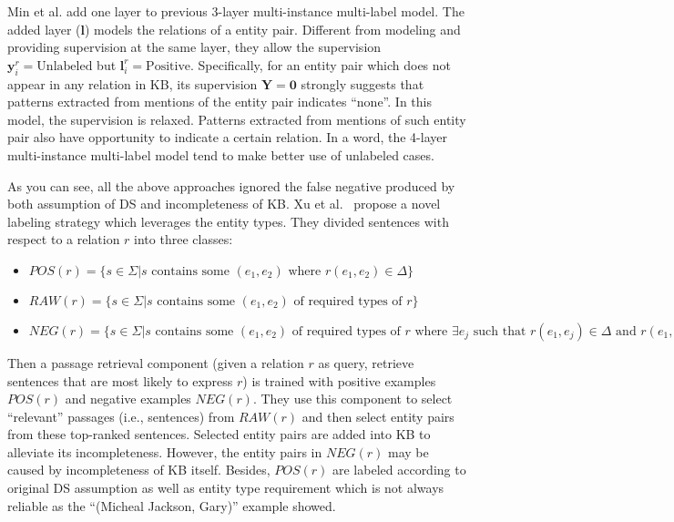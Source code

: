 \documentclass[10pt]{article} %
\theoremstyle{definition}
\theoremstyle{definition}
\begin{document}
Min et al. add one layer to previous 3-layer multi-instance multi-label model. 
The added layer ($\mathbf{l}$) models the relations of a entity pair. 
Different from modeling and providing supervision at the same layer, they allow the supervision $\mathbf{y}_{i}^{r}=\text{Unlabeled}$ but $\mathbf{l}_{i}^{r}=\text{Positive}$. 
Specifically, for an entity pair which does not appear in any relation in KB, its supervision $\mathbf{Y}=\mathbf{0}$ strongly suggests 
that patterns extracted from mentions of the entity pair indicates ``none''. 
In this model, the supervision is relaxed. 
Patterns extracted from mentions of such entity pair also have opportunity to indicate a certain relation. 
In a word, the 4-layer multi-instance multi-label model tend to make better use of unlabeled cases. 


As you can see, all the above approaches ignored the false negative produced by both assumption of DS and incompleteness of KB. 
Xu et al.~\cite{xu} propose a novel labeling strategy which leverages the entity types. 
They divided sentences with respect to a relation $r$ into three classes: 
\begin{itemize}
\item $POS(r)=\{s\in\Sigma\vert{}s\text{ contains some }(e_1,e_2)\text{ where }r(e_1,e_2)\in\Delta\}$ 
\item $RAW(r)=\{s\in\Sigma\vert{}s\text{ contains some }(e_1,e_2)\text{ of required types of }r\}$
\item $NEG(r)=\{s\in\Sigma\vert{}s\text{ contains some }(e_1,e_2)\text{ of required types of }r\text{ where }\exists{}e_j\text{ such that }r(e_1,e_j)\in\Delta\text{ and }r(e_1,e_2)\notin\Delta\}$
\end{itemize}
Then a passage retrieval component (given a relation $r$ as query, retrieve sentences that are most likely to express $r$) is trained with positive examples $POS(r)$ and negative examples $NEG(r)$. 
They use this component to select ``relevant'' passages (i.e., sentences) from $RAW(r)$ and then select entity pairs from these top-ranked sentences. 
Selected entity pairs are added into KB to alleviate its incompleteness. 
However, the entity pairs in $NEG(r)$ may be caused by incompleteness of KB itself. 
Besides, $POS(r)$ are labeled according to original DS assumption as well as entity type requirement which is not always reliable as the ``(Micheal Jackson, Gary)'' example showed. 
\end{document}

